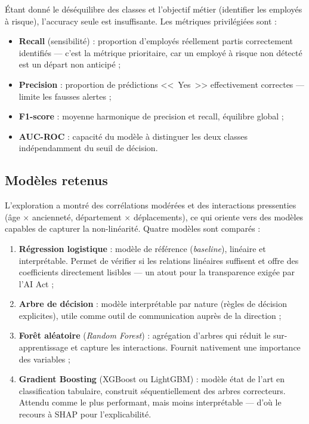 Étant donné le déséquilibre des classes et l'objectif métier (identifier les employés à risque), l'accuracy seule est insuffisante. Les métriques privilégiées sont :
\begin{itemize}
    \item \textbf{Recall} (sensibilité) : proportion d'employés réellement partis correctement identifiés --- c'est la métrique prioritaire, car un employé à risque non détecté est un départ non anticipé ;
    \item \textbf{Precision} : proportion de prédictions <<~Yes~>> effectivement correctes --- limite les fausses alertes ;
    \item \textbf{F1-score} : moyenne harmonique de precision et recall, équilibre global ;
    \item \textbf{AUC-ROC} : capacité du modèle à distinguer les deux classes indépendamment du seuil de décision.
\end{itemize}

\subsection{Modèles retenus}

L'exploration a montré des corrélations modérées et des interactions pressenties (âge $\times$ ancienneté, département $\times$ déplacements), ce qui oriente vers des modèles capables de capturer la non-linéarité. Quatre modèles sont comparés :

\begin{enumerate}
    \item \textbf{Régression logistique} : modèle de référence (\textit{baseline}), linéaire et interprétable. Permet de vérifier si les relations linéaires suffisent et offre des coefficients directement lisibles --- un atout pour la transparence exigée par l'AI Act ;
    \item \textbf{Arbre de décision} : modèle interprétable par nature (règles de décision explicites), utile comme outil de communication auprès de la direction ;
    \item \textbf{Forêt aléatoire} (\textit{Random Forest}) : agrégation d'arbres qui réduit le sur-apprentissage et capture les interactions. Fournit nativement une importance des variables ;
    \item \textbf{Gradient Boosting} (XGBoost ou LightGBM) : modèle état de l'art en classification tabulaire, construit séquentiellement des arbres correcteurs. Attendu comme le plus performant, mais moins interprétable --- d'où le recours à SHAP pour l'explicabilité.
\end{enumerate}

